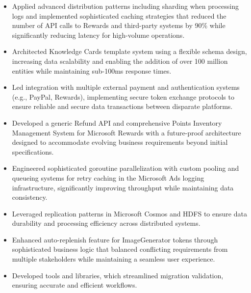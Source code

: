 \begin{itemize}
    \item \scriptsize{Applied advanced distribution patterns including sharding when processing logs and 
        implemented sophisticated caching strategies that reduced the number of API calls to Rewards and 
        third-party systems by 90\% while significantly reducing latency for high-volume operations.}
        
    \item \scriptsize{Architected Knowledge Cards template system using a flexible schema design, 
        increasing data scalability and enabling the addition of over 100 million entities while 
        maintaining sub-100ms response times.}
        
    \item \scriptsize{Led integration with multiple external payment and authentication systems (e.g., 
        PayPal, Rewards), implementing secure token exchange protocols to ensure reliable and secure 
        data transactions between disparate platforms.}
        
    \item \scriptsize{Developed a generic Refund API and comprehensive Points Inventory Management 
        System for Microsoft Rewards with a future-proof architecture designed to accommodate evolving 
        business requirements beyond initial specifications.}
        
    \item \scriptsize{Engineered sophisticated goroutine parallelization with custom pooling and 
        queueing systems for retry caching in the Microsoft Ads logging infrastructure, significantly 
        improving throughput while maintaining data consistency.}
        
    \item \scriptsize{Leveraged replication patterns in Microsoft Cosmos and HDFS to ensure data 
        durability and processing efficiency across distributed systems.}
        
    \item \scriptsize{Enhanced auto-replenish feature for ImageGenerator tokens through sophisticated 
        business logic that balanced conflicting requirements from multiple stakeholders while 
        maintaining a seamless user experience.}
    
    \item \scriptsize{Developed tools and libraries, which streamlined migration validation, ensuring 
        accurate and efficient workflows.}
        

\end{itemize}
